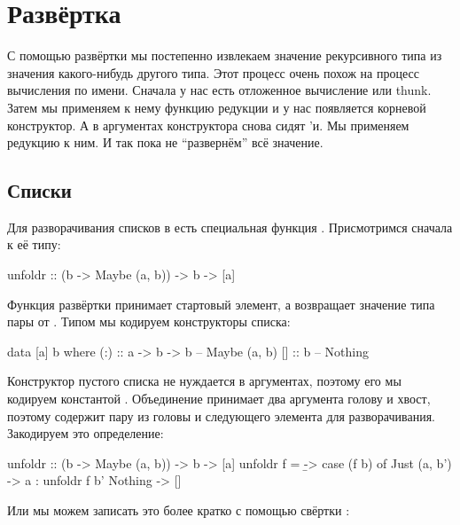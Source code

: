 \section{Развёртка}

 С помощью развёртки мы постепенно извлекаем значение
рекурсивного типа из значения какого-нибудь другого типа. Этот процесс
очень похож на процесс вычисления по имени. Сначала у нас есть
отложенное вычисление или thunk. Затем мы применяем к нему функцию
редукции и у нас появляется корневой конструктор. А в аргументах
конструктора снова сидят 'и. Мы применяем редукцию к ним. И
так пока не ``развернём'' всё значение.

\subsection{Списки}

Для разворачивания списков в  есть специальная функция
. Присмотримся сначала к её типу:


\begin{code}
unfoldr :: (b -> Maybe (a, b)) -> b -> [a]
\end{code}

Функция развёртки принимает стартовый элемент, а возвращает значение
типа пары от . Типом  мы кодируем конструкторы
списка:


\begin{code}
data [a] b where
    (:)  :: a -> b -> b     -- Maybe (a, b)
    []   :: b               -- Nothing
\end{code}

Конструктор пустого списка не нуждается в аргументах, поэтому его мы
кодируем константой . Объединение принимает два аргумента
голову и хвост, поэтому  содержит пару из головы и следующего
элемента для разворачивания. Закодируем это определение:


\begin{code}
unfoldr :: (b -> Maybe (a, b)) -> b -> [a]
unfoldr f = \b -> case (f b) of
    Just (a, b') -> a : unfoldr f b'
    Nothing      -> []
\end{code}

Или мы можем записать это более кратко с помощью свёртки :




